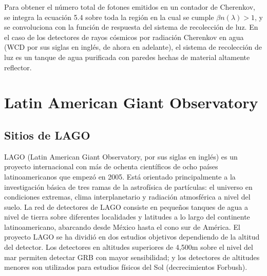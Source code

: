 \documentclass{book}
\begin{document}
Para obtener el n\'umero total de fotones emitidos en un contador de Cherenkov, se integra la ecuaci\'on 5.4 sobre toda la regi\'on en la cual se cumple $\beta n(\lambda) > 1$, y se convoluciona con la funci\'on de respuesta del sistema de recolecci\'on de luz. En el caso de los detectores de rayos c\'osmicos por radiaci\'on Cherenkov en agua (WCD por sus siglas en ingl\'es, de ahora en adelante), el sistema de recolecci\'on de luz es un tanque de agua purificada con paredes hechas de material altamente reflector.

\section{Latin American Giant Observatory}
\subsection{Sitios de LAGO}
LAGO (Latin American Giant Observatory, por sus siglas en ingl\'es) es un proyecto internacional con m\'as de ochenta cient\'ificos de ocho pa\'ises latinoamericanos que empez\'o en 2005. Est\'a orientado principalmente a la investigaci\'on b\'asica de tres ramas de la astrof\'isica de part\'iculas: el universo en condiciones extremas, clima interplanetario y radiaci\'on atmosf\'erica a nivel del suelo. La red de detectores de LAGO consiste en peque\~nos tanques de agua a nivel de tierra sobre diferentes localidades y latitudes a lo largo del continente latinoamericano, abarcando desde M\'exico hasta el cono sur de Am\'erica. El proyecto LAGO se ha dividi\'o en dos estudios objetivos dependiendo de la altitud del detector. Los detectores en altitudes superiores de 4,500m sobre el nivel del mar permiten detectar GRB con mayor sensibilidad; y los detectores de altitudes menores son utilizados para estudios f\'isicos del Sol (decrecimientos Forbush). \citep{ASOREY2015}
\end{document}
